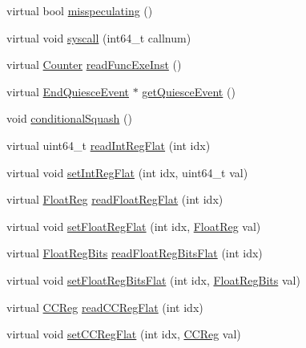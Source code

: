 \begin{DoxyCompactItemize}
\item 
virtual bool \hyperlink{classO3ThreadContext_a32d306133270d25950961c23f6be76e1}{misspeculating} ()
\item 
virtual void \hyperlink{classO3ThreadContext_a064ef126d662dea947c40adfa6b5a490}{syscall} (int64\_\-t callnum)
\item 
virtual \hyperlink{base_2types_8hh_ae1475755791765b8e6f6a8bb091e273e}{Counter} \hyperlink{classO3ThreadContext_a73cff115f1db487a2b2e2cb162035cf5}{readFuncExeInst} ()
\item 
virtual \hyperlink{classEndQuiesceEvent}{EndQuiesceEvent} $\ast$ \hyperlink{classO3ThreadContext_abe1122860803a2563325469d9d41f47a}{getQuiesceEvent} ()
\item 
void \hyperlink{classO3ThreadContext_a08e5264ebc09ba108b6147ed5060ad92}{conditionalSquash} ()
\item 
virtual uint64\_\-t \hyperlink{classO3ThreadContext_aed7abd4afcb954f8612e4ef1fe73317a}{readIntRegFlat} (int idx)
\item 
virtual void \hyperlink{classO3ThreadContext_ae3b8c9c2c1ae95767f0703357957a3f8}{setIntRegFlat} (int idx, uint64\_\-t val)
\item 
virtual \hyperlink{classThreadContext_a75484259f1855aabc8d74c6eb1cfe186}{FloatReg} \hyperlink{classO3ThreadContext_abdeceb5c5aac44f73966cdb8a588d5d5}{readFloatRegFlat} (int idx)
\item 
virtual void \hyperlink{classO3ThreadContext_a71ec23ca2c029120932e5af4babc0da1}{setFloatRegFlat} (int idx, \hyperlink{classThreadContext_a75484259f1855aabc8d74c6eb1cfe186}{FloatReg} val)
\item 
virtual \hyperlink{classThreadContext_aab5eeae86499f9bfe15ef79360eccc64}{FloatRegBits} \hyperlink{classO3ThreadContext_a86d029a01b9faaab8b1480cd407528e6}{readFloatRegBitsFlat} (int idx)
\item 
virtual void \hyperlink{classO3ThreadContext_acd974292ff0461c2e94c0b5a1126b503}{setFloatRegBitsFlat} (int idx, \hyperlink{classThreadContext_aab5eeae86499f9bfe15ef79360eccc64}{FloatRegBits} val)
\item 
virtual \hyperlink{classThreadContext_a0c9de550a32808e6a25b54b6c791d5ab}{CCReg} \hyperlink{classO3ThreadContext_a576cfb60d7a873b30da62dc738e0e8ce}{readCCRegFlat} (int idx)
\item 
virtual void \hyperlink{classO3ThreadContext_a6dec2284dd5904f992642f24bb289f14}{setCCRegFlat} (int idx, \hyperlink{classThreadContext_a0c9de550a32808e6a25b54b6c791d5ab}{CCReg} val)
\end{DoxyCompactItemize}
